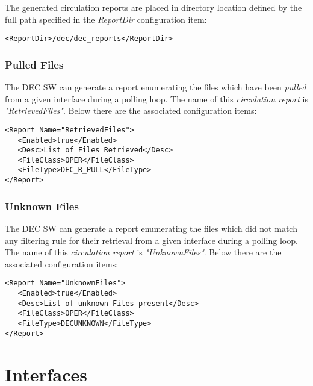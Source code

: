 \documentclass[dec_sum_main.tex]{subfiles}
\begin{document}
\par
\noindent
The generated circulation reports are placed in directory location defined by the full path specified in the \textit{ReportDir} configuration item: \begin{verbatim}<ReportDir>/dec/dec_reports</ReportDir>\end{verbatim} 

\subsubsection{Pulled Files}
The DEC SW can generate a report enumerating the files which have been \textit{pulled} from a given interface during a polling loop. The name of this \textit{circulation report} is \textit{"RetrievedFiles"}. Below there are the associated configuration items: 

\par
\noindent

\begin{verbatim}
<Report Name="RetrievedFiles">
   <Enabled>true</Enabled>
   <Desc>List of Files Retrieved</Desc>
   <FileClass>OPER</FileClass>
   <FileType>DEC_R_PULL</FileType>
</Report>
\end{verbatim}

\subsubsection{Unknown Files}
The DEC SW can generate a report enumerating the files which did not match any filtering rule for their retrieval from a given interface during a polling loop. The name of this \textit{circulation report} is \textit{"UnknownFiles"}. Below there are the associated configuration items: 

\par
\noindent

\begin{verbatim}
<Report Name="UnknownFiles">
   <Enabled>true</Enabled>
   <Desc>List of unknown Files present</Desc>
   <FileClass>OPER</FileClass>
   <FileType>DECUNKNOWN</FileType>
</Report>
\end{verbatim}



\section{Interfaces}
 
\end{document}
